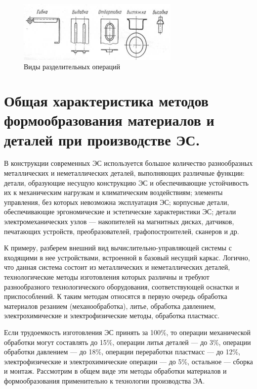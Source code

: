 \documentclass[unicode, 12pt, a4paper, oneside]{article}
\begin{document}
\begin{figure}[htbp]
\centering
\includegraphics[width=0.7\textwidth]{98_operations2.png}
\caption{Виды разделительных операций}
\label{fig:98_operations2}
\end{figure}

\section{Общая характеристика методов формообразования материалов и деталей при производстве ЭС.}

В конструкции современных ЭС используется большое количество разнообразных металлических и неметаллических деталей, выполняющих различные функции: детали, образующие несущую конструкцию ЭС и обеспечивающие устойчивость их к механическим нагрузкам и климатическим воздействиям; элементы управления, без которых невозможна эксплуатация ЭС; корпусные детали, обеспечивающие эргономические и эстетические характеристики ЭС; детали электромеханических узлов — накопителей на магнитных дисках, датчиков, печатающих устройств, преобразователей, графопостроителей, сканеров и др. 

К примеру, разберем внешний вид вычислительно-управляющей системы с входящими в нее устройствами, встроенной в базовый несущий каркас. Логично, что данная система состоит из металлических и неметаллических деталей, технологические методы изготовления которых различны и требуют разнообразного технологического оборудования, соответствующей оснастки и приспособлений. К таким методам относятся в первую очередь обработка материалов резанием (механообработка), литье, обработка давлением, электрохимические и электрофизические методы, обработка пластмасс.

Если трудоемкость изготовления ЭС принять за 100\%, то операции механической обработки могут составлять до 15\%, операции литья деталей — до 3\%, операции обработки давлением — до 18\%, операции переработки пластмасс — до 12\%, электрофизические и электрохимические операции — до 5\%, остальное — сборка и монтаж. Рассмотрим в общем виде эти методы обработки материалов и формообразования применительно к технологии производства ЭА.
\end{document}
